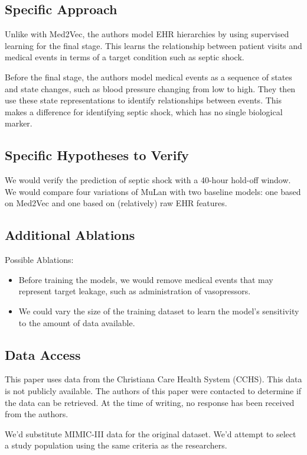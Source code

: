 \documentclass[11pt,a4paper]{article}
\begin{document}
\subsection{Specific Approach}
Unlike with Med2Vec, the authors model EHR hierarchies by using supervised learning for the final stage. This learns the relationship between patient visits and medical events in terms of a target condition such as septic shock.

Before the final stage, the authors model medical events as a sequence of states and state changes, such as blood pressure changing from low to high. They then use these state representations to identify relationships between events. This makes a difference for identifying septic shock, which has no single biological marker.

\subsection{Specific Hypotheses to Verify}
We would verify the prediction of septic shock with a 40-hour hold-off window. We would compare four variations of MuLan with two baseline models: one based on Med2Vec and one based on (relatively) raw EHR features.

\subsection{Additional Ablations}
Possible Ablations:
\begin{itemize}
  \item Before training the models, we would remove medical events that may represent target leakage, such as administration of vasopressors.
  \item We could vary the size of the training dataset to learn the model's sensitivity to the amount of data available.
\end{itemize}

\subsection{Data Access}
This paper uses data from the Christiana Care Health System (CCHS). This data is not publicly available. The authors of this paper were contacted to determine if the data can be retrieved. At the time of writing, no response has been received from the authors.

We'd substitute MIMIC-III data for the original dataset. We'd attempt to select a study population using the same criteria as the researchers.
\end{document}
